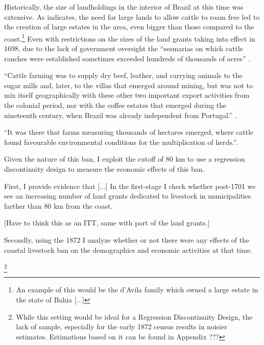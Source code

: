 \documentclass{article}
\begin{document}
Historically, the size of landholdings in the interior of Brazil at this time was extensive. 
As \textcite[p~.41]{Fausto2014-bh} indicates, the need for large lands to allow cattle to roam free led to the creation of large estates in the area, even bigger than those compared to the coast.\footnote{An example of this would be the d'Avila family which owned a large estate in the state of Bahia [...]}
Even with restrictions on the sizes of the land grants taking into effect in 1698, due to the lack of government oversight the  ``sesmarias on which cattle ranches were established sometimes exceeded hundreds of thousands of acres'' \parencite{Bethell1984-of}.


\parencite[p~.]{Boxer1962-bj}

``Cattle farming was to supply dry beef, leather, and carrying animals to the sugar mills and, later, to the villas that emerged around mining, but was not to mix itself geographically with these other two important export activities from the colonial period, nor with the coffee estates that emerged during the nineteenth century,  when  Brazil was already independent from  Portugal.'' \parencite{Ribeiro2012-lb}.

``It was there that farms measuring thousands of hectares emerged, where cattle found favourable environmental conditions for the multiplication of herds.''\parencite{Ribeiro2012-lb}.


Given the nature of this ban, I exploit the cutoff of 80 km to use a regression discontinuity design to measure the economic effects of this ban. 

First, I provide evidence that [...] In the first-stage I check whether post-1701 we see an increasing number of land grants dedicated to livestock in municipalities farther than 80 km from the coast. 

[Have to think this as an ITT, same with part of the land grants.]

Secondly, using the 1872 I analyze whether or not there were any effects of the coastal livestock ban on the demographics and economic activities at that time.

\footnote{While this setting would be ideal for a Regression Discontinuity Design, the lack of sample, especially for the early 1872 census results in noisier estimates. Estimations based on it can be found in Appendix ???}
\end{document}
